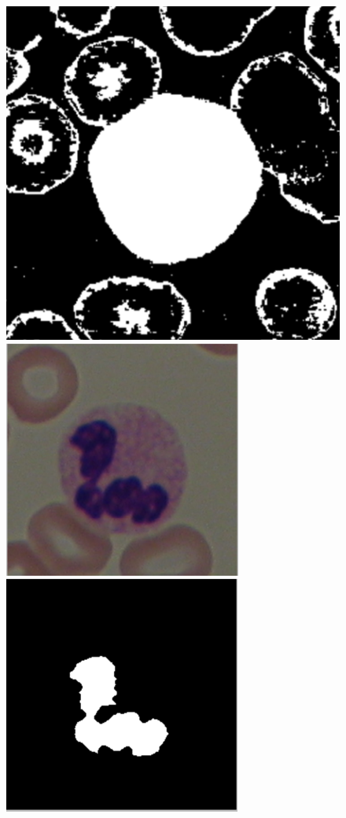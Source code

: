 \documentclass[final,a4paper,12pt,english]{UnicaPhdThesis3}
\begin{document}
\begin{figure}[!b]
		\includegraphics[height=0.10\textheight]{images/2015_1_caip/1-3}\vspace{0.5mm}
		\includegraphics[height=0.10\textheight]{images/2015_1_caip/2-1}
		\includegraphics[height=0.10\textheight]{images/2015_1_caip/2-3}

\end{figure}
\end{document}
